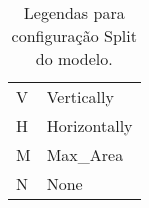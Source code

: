 \begin{table}
    \centering
    \caption{Legendas para configuração Split do modelo.}
    \label{tab:split}
    \begin{tabular}{ll}
        \hline
        V & Vertically   \\
        H & Horizontally \\
        M & Max\_Area    \\
        N & None         \\
        \hline
    \end{tabular}
\end{table}
